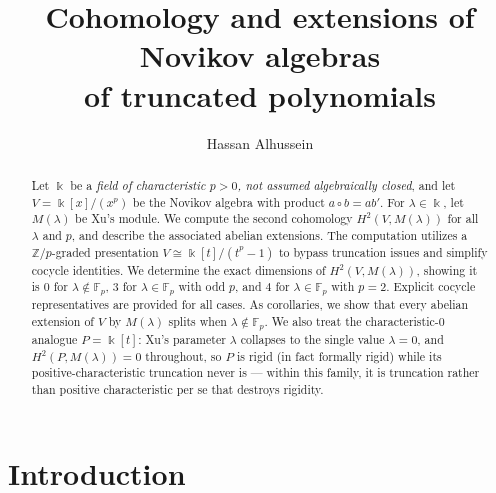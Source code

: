 \documentclass[11pt,reqno]{amsart}
\theoremstyle{plain}
\theoremstyle{definition}
\newcommand{\kk}{\Bbbk}
\newcommand{\Ht}{H^2}
\newcommand{\Fp}{\mathbb{F}_p}
\newcommand{\Zp}{\mathbb{Z}/p}
\begin{document}
\title[Cohomology and extensions of truncated Novikov algebras]
{Cohomology and extensions of Novikov algebras\\ of truncated polynomials}

\author{Hassan Alhussein}
\address{Siberian State University of Telecommunications and Information Sciences,
Novosibirsk, Russia}
\address{Novosibirsk State University of Economics and Management, Novosibirsk, Russia}



\begin{abstract}
Let $\kk$ be a \emph{field of characteristic $p>0$, not assumed algebraically closed}, and
let $V=\kk[x]/(x^p)$ be the Novikov algebra with product $a\circ b=ab'$. For $\lambda\in\kk$,
let $M(\lambda)$ be Xu's module. We compute the second cohomology $\Ht(V,M(\lambda))$ for all $\lambda$
and $p$, and describe the associated abelian extensions. The computation utilizes a
$\Zp$-graded presentation $V\cong\kk[t]/(t^p-1)$ to bypass truncation issues and simplify
cocycle identities. We determine the exact dimensions of $\Ht(V,M(\lambda))$, showing it is
$0$ for $\lambda\notin\Fp$, $3$ for $\lambda\in\Fp$ with odd $p$, and $4$ for $\lambda\in\Fp$
with $p=2$. Explicit cocycle representatives are provided for all cases. As corollaries, we
show that every abelian extension of $V$ by $M(\lambda)$ splits when $\lambda\notin\Fp$. We
also treat the characteristic-$0$ analogue $P=\kk[t]$: Xu's parameter $\lambda$ collapses to
the single value $\lambda=0$, and $\Ht(P,M(\lambda))=0$ throughout, so $P$ is rigid (in fact
formally rigid) while its positive-characteristic truncation never is --- within this family,
it is truncation rather than positive characteristic per se that destroys rigidity.
\end{abstract}

\maketitle


\section{Introduction}\label{sec:intro}
\end{document}
